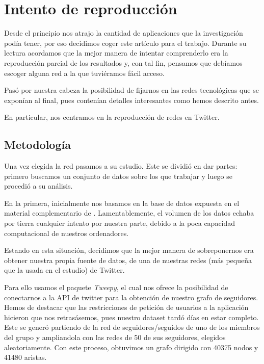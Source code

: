 \documentclass[1p]{elsarticle}
\begin{document}
\section{Intento de reproducción}

Desde el principio nos atrajo la cantidad de aplicaciones que la investigación podía tener, por eso decidimos coger este artículo para el trabajo. Durante su lectura acordamos que la mejor manera de intentar comprenderlo era la reproducción parcial de los resultados y, con tal fin, pensamos que debíamos escoger alguna red a la que tuviéramos fácil acceso.

Pasó por nuestra cabeza la posibilidad de fijarnos en las redes tecnológicas que se exponían al final, pues contenían detalles interesantes como hemos descrito antes.

En particular, nos centramos en la reproducción de redes en Twitter. 

\subsection{Metodología}
    Una vez elegida la red pasamos a su estudio.
    Este se dividió en dar partes: primero buscamos un conjunto de datos sobre los que trabajar y luego se procedió a su análisis.
    
    En la primera, inicialmente nos basamos en la base de datos expuesta en el material complementario de \cite{arti}. 
    Lamentablemente, el volumen de los datos echaba por tierra cualquier intento por nuestra parte, debido a la poca capacidad computacional de nuestros ordenadores.

Estando en esta situación, decidimos que la mejor manera de sobreponernos era obtener nuestra propia fuente de datos, de una de nuestras redes (más pequeña que la usada en el estudio) de Twitter.

    Para ello usamos el paquete \textit{Tweepy}, el cual nos ofrece la posibilidad de conectarnos a la API de twitter para la obtención de nuestro grafo de seguidores.
    Hemos de destacar que las restricciones de petición de usuarios a la aplicación hicieron que nos retrasásemos, pues nuestro dataset tardó días en estar completo.
    Este se generó partiendo de la red de seguidores/seguidos de uno de los miembros del grupo y ampliandola con las redes de 50 de sus seguidores, elegidos aleatoriamente.
    Con este proceso, obtuvimos un grafo dirigido con 40375 nodos y 41480 aristas.
\end{document}
